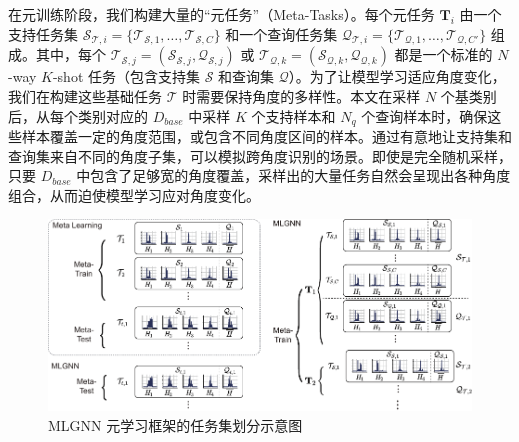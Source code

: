 在元训练阶段，我们构建大量的“元任务”（Meta-Tasks）。每个元任务 $\mathbf{T}_i$ 由一个支持任务集 $\mathcal{S}_{\mathcal{T},i} = \{\mathcal{T}_{\mathcal{S},1}, \dots, \mathcal{T}_{\mathcal{S},C}\}$ 和一个查询任务集 $\mathcal{Q}_{\mathcal{T},i} = \{\mathcal{T}_{\mathcal{Q},1}, \dots, \mathcal{T}_{\mathcal{Q},C'}\}$ 组成。其中，每个 $\mathcal{T}_{\mathcal{S},j} = (\mathcal{S}_{\mathcal{S},j}, \mathcal{Q}_{\mathcal{S},j})$ 或 $\mathcal{T}_{\mathcal{Q},k} = (\mathcal{S}_{\mathcal{Q},k}, \mathcal{Q}_{\mathcal{Q},k})$ 都是一个标准的 $N$-way $K$-shot 任务（包含支持集 $\mathcal{S}$ 和查询集 $\mathcal{Q}$）。为了让模型学习适应角度变化，我们在构建这些基础任务 $\mathcal{T}$ 时需要保持角度的多样性。本文在采样 $N$ 个基类别后，从每个类别对应的 $D_{base}$ 中采样 $K$ 个支持样本和 $N_q$ 个查询样本时，确保这些样本覆盖一定的角度范围，或包含不同角度区间的样本。通过有意地让支持集和查询集来自不同的角度子集，可以模拟跨角度识别的场景。即使是完全随机采样，只要 $D_{base}$ 中包含了足够宽的角度覆盖，采样出的大量任务自然会呈现出各种角度组合，从而迫使模型学习应对角度变化。

\begin{figure}[h]
    \centering
    \includegraphics[width=\linewidth]{figures/mlgnn.pdf}
    \caption{MLGNN 元学习框架的任务集划分示意图}
    \label{fig:mlgnn_structure} %
\end{figure}

